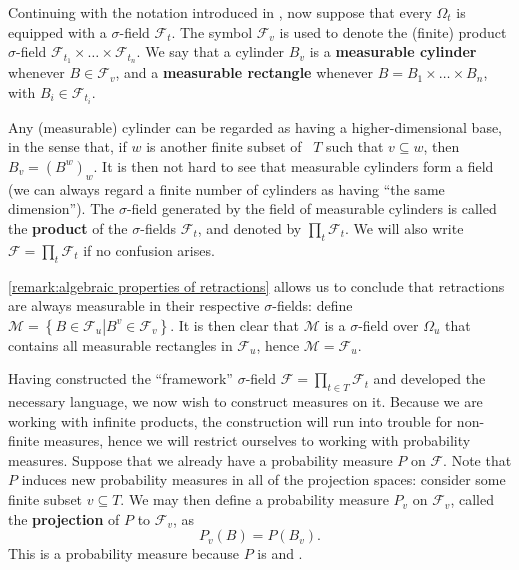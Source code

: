 \begin{defn}\label{definition:measurable cylinders}
Continuing with the notation introduced in , now suppose that every \(\Omega_t\) is equipped with a \(\sigma\)-field \(\mathcal{F}_t\). The symbol \(\mathcal{F}_v\) is used to denote the (finite) product \(\sigma\)-field \(\mathcal{F}_{t_{1}}\times \dots \times \mathcal{F}_{t_{n}}\). We say that a cylinder \(B_v\) is a \textbf{measurable cylinder} whenever \(B\in\mathcal{F}_v\), and a \textbf{measurable rectangle} whenever \(B=B_1\times\dots\times B_n\), with \(B_i\in\mathcal{F}_{t_i}\).

Any (measurable) cylinder can be regarded as having a higher-dimensional base, in the sense that, if \(w\) is another finite subset of ~\(T\) such that \(v\subseteq w\), then \(B_v=\left(B^w\right)_{w}\). It is then not hard to see that measurable cylinders form a field (we can always regard a finite number of cylinders as having ``the same dimension''). The \(\sigma\)-field generated by the field of measurable cylinders is called the \textbf{product} of the \(\sigma\)-fields \(\mathcal{F}_t\), and denoted by \(\prod_t\mathcal{F}_t\). We will also write \(\mathcal{F}=\prod_{t}\mathcal{F}_t\) if no confusion arises.
\end{defn}
\begin{remk}
		\cref{remark:algebraic properties of retractions} allows us to conclude that retractions are always measurable in their respective \(\sigma\)-fields: define \(\mathcal{M}=\left\{B\in\mathcal{F}_u\left|B^v\in\mathcal{F}_v\right.\right\}\). It is then clear that \(\mathcal{M}\) is a \(\sigma\)-field over \(\Omega_u\) that contains all measurable rectangles in \(\mathcal{F}_u\), hence \(\mathcal{M}=\mathcal{F}_u\).
\end{remk}
Having constructed the ``framework'' \(\sigma\)-field \(\mathcal{F}=\prod_{t\in 
T}\mathcal{F}_t\) and developed the necessary language, we now wish to construct measures on it. Because we are
working with infinite products, the construction will run into trouble
for non-finite measures, hence we will restrict ourselves to working with probability measures. Suppose that we already have a probability measure \(P\) on \(\mathcal{F}\). Note that \(P\) induces new probability measures in all of the projection spaces: consider some finite subset \(v\subseteq T\). We may then define a probability measure \(P_v\) on \(\mathcal{F}_v\), called the \textbf{projection} of \(P\) to \(\mathcal{F}_v\), as
\[
		P_v(B)=P(B_v)
.\]
This is a probability measure because \(P\) is and . 

